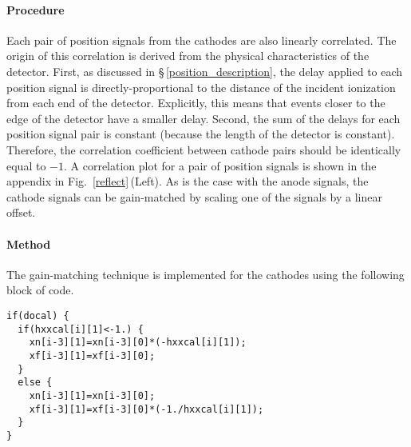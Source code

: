 \paragraph{Procedure}
Each pair of position signals from the cathodes are also linearly correlated.  The origin of this correlation is derived from the physical characteristics of the detector.  First, as discussed in \S\,\ref{position_description}, the delay applied to each position signal is directly-proportional to the distance of the incident ionization from each end of the detector.  Explicitly, this means that events closer to the edge of the detector have a smaller delay. Second, the sum of the delays for each position signal pair is constant (because the length of the detector is constant).  Therefore, the correlation coefficient between cathode pairs should be identically equal to $-1$. A correlation plot for a pair of position signals is shown in the appendix in Fig.~\ref{reflect}\,(Left). As is the case with the anode signals, the cathode signals can be gain-matched by scaling one of the signals by a linear offset.
\paragraph{Method}
The gain-matching technique is implemented for the cathodes using the following block of code.
\vspace{0.5\baselineskip}
\par\noindent
\begin{minipage}{\linewidth}
  \singlespace
\begin{lstlisting}[caption={The index \texttt{i} runs over 3--6 for each cathode pair. Here \texttt{xn[i-3][0]} refers to the (uncalibrated) ``near'' position signal and \texttt{xf[i-3][0]} refers to the ``far'' position signal.  These labels correspond to those given in Table~\ref{TDC_signals} and are defined from the perspective of the beam.   The nested \texttt{if} statement is used so that neither signal is compressed; one of the signals is expanded to set the correlation coefficient to $-1$.},label=cathode_scaling]
if(docal) {
  if(hxxcal[i][1]<-1.) {
    xn[i-3][1]=xn[i-3][0]*(-hxxcal[i][1]);
    xf[i-3][1]=xf[i-3][0];
  }
  else {
    xn[i-3][1]=xn[i-3][0]; 
    xf[i-3][1]=xf[i-3][0]*(-1./hxxcal[i][1]);
  }
}
\end{lstlisting}
\end{minipage}

